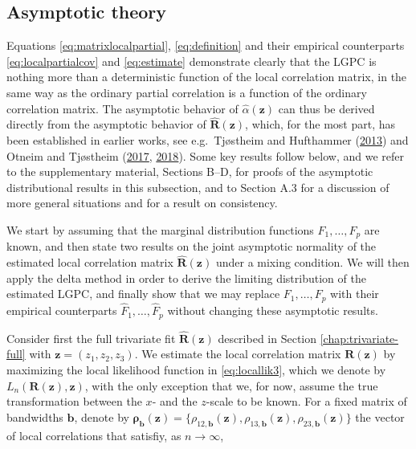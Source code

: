 \documentclass[
  12pt,
  letterpaper]{article}
\newcommand{\z}{\bm{z}}
\newcommand{\R}{\bm{R}}
\newcommand{\hR}{\widehat{\bm{R}}}
\newcommand{\hF}{\widehat{F}}
\newcommand{\frho}{\bm{\rho}}
\newcommand{\hh}{\bm{b}}
\newcommand{\halpha}{\widehat{\alpha}}
\theoremstyle{definition}
\theoremstyle{definition}
\theoremstyle{definition}
\theoremstyle{remark}
\begin{document}
\hypertarget{chap:asymptotic}{%
\subsection{Asymptotic theory}\label{chap:asymptotic}}

Equations \eqref{eq:matrixlocalpartial}, \eqref{eq:definition} and their empirical counterparts \eqref{eq:localpartialcov} and \eqref{eq:estimate} demonstrate clearly that the LGPC is nothing more than a deterministic function of the local correlation matrix, in the same way as the ordinary partial correlation is a function of the ordinary correlation matrix. The asymptotic behavior of \(\halpha(\z)\) can thus be derived directly from the asymptotic behavior of \(\hR(\z)\), which, for the most part, has been established in earlier works, see e.g.~Tjøstheim and Hufthammer (\protect\hyperlink{ref-tjostheim2013local}{2013}) and Otneim and Tjøstheim (\protect\hyperlink{ref-otneim2017locally}{2017}, \protect\hyperlink{ref-otneim2017conditional}{2018}). Some key results follow below, and we refer to the supplementary material, Sections B--D, for proofs of the asymptotic distributional results in this subsection, and to Section A.3 for a discussion of more general situations and for a result on consistency.

We start by assuming that the marginal distribution functions \(F_1, \ldots, F_p\) are known, and then state two results on the joint asymptotic normality of the estimated local correlation matrix \(\hR(\z)\) under a mixing condition. We will then apply the delta method in order to derive the limiting distribution of the estimated LGPC, and finally show that we may replace \(F_1,\ldots,F_p\) with their empirical counterparts \(\hF_1,\ldots,\hF_p\) without changing these asymptotic results.

Consider first the full trivariate fit \(\hR(\z)\) described in Section \ref{chap:trivariate-full} with \(\z = (z_1,z_2,z_3)\). We estimate the local correlation matrix \(\R(\z)\) by maximizing the local likelihood function in \eqref{eq:locallik3}, which we denote by \(L_n(\R(\z), \z)\), with the only exception that we, for now, assume the true transformation between the \(x\)- and the \(z\)-scale to be known. For a fixed matrix of bandwidths \(\hh\), denote by \(\frho_{\hh}(\z) = \{\rho_{12,\hh}(\z), \rho_{13,\hh}(\z), \rho_{23,\hh}(\z)\}\) the vector of local correlations that satisfiy, as \(n \rightarrow \infty\),
\end{document}
